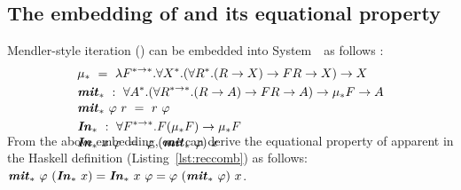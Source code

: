 \subsection{The embedding of \MIt{*} and its equational property}
\label{sec:theory:mit}
Mendler-style iteration (\MIt{*}) can be embedded into
System~\Fw\ as follows \cite{AbeMatUus05,AhnShe11}:\vspace*{-1ex}
\begin{align*}
&\mu_{*} ~=~ \lambda F^{* \to *}.\forall X^{*}.
		(\forall R^{*}.(R \to X) \to F R \to X) \to X
	\\
&\textbf{\textit{mit}}_{*} ~:~ \forall A^{*}.
	(\forall R^{* \to *}.(R \to A) \to F R \to A) \to \mu_{*} F \to A
\\[-.5ex]
&\textbf{\textit{mit}}_{*}~\varphi~r ~=~ r~\varphi
	\\
&\textbf{\textit{In}}_{*} ~:~\forall F^{* \to *}.F(\mu_{*} F) \to \mu_{*} F \\[-.5ex]
&\textbf{\textit{In}}_{*}~x~\varphi ~=~ \varphi~(\textbf{\textit{mit}}_{*}~\varphi)~x\\[-5ex]
\end{align*}
From the above embedding, one can derive the equational property of \MIt{*}
apparent in the Haskell definition (Listing~\ref{lst:reccomb}) as follows:
$\textbf{\textit{mit}}_{*}~\varphi~(\textbf{\textit{In}}_{*}~x) = \textbf{\textit{In}}_{*}~x~\varphi = \varphi~(\textbf{\textit{mit}}_{*}~\varphi)~x$.

